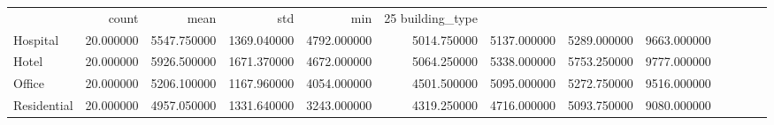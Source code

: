 \begin{tabular}{lrrrrrrrr}
 & count & mean & std & min & 25%
building_type &  &  &  &  &  &  &  &  \\
Hospital & 20.000000 & 5547.750000 & 1369.040000 & 4792.000000 & 5014.750000 & 5137.000000 & 5289.000000 & 9663.000000 \\
Hotel & 20.000000 & 5926.500000 & 1671.370000 & 4672.000000 & 5064.250000 & 5338.000000 & 5753.250000 & 9777.000000 \\
Office & 20.000000 & 5206.100000 & 1167.960000 & 4054.000000 & 4501.500000 & 5095.000000 & 5272.750000 & 9516.000000 \\
Residential & 20.000000 & 4957.050000 & 1331.640000 & 3243.000000 & 4319.250000 & 4716.000000 & 5093.750000 & 9080.000000 \\
\end{tabular}
